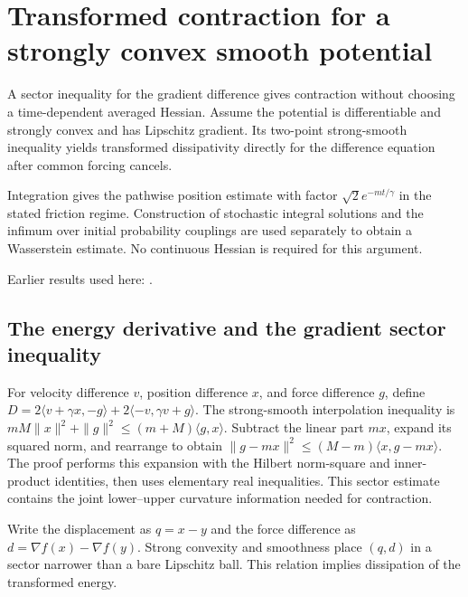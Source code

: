 \documentclass[11pt,a4paper]{report}
\begin{document}
\section{\texorpdfstring{Transformed contraction for a strongly convex smooth potential}{Transformed contraction for a strongly convex smooth potential}}
\label{proof-module-KineticLangevin-PotentialContraction-lean}


A sector inequality for the gradient difference gives contraction without choosing a time-dependent averaged Hessian. Assume the potential is differentiable and strongly convex and has Lipschitz gradient. Its two-point strong-smooth inequality yields transformed dissipativity directly for the difference equation after common forcing cancels.



Integration gives the pathwise position estimate with factor \(\sqrt2e^{-mt/\gamma}\) in the stated friction regime. Construction of stochastic integral solutions and the infimum over initial probability couplings are used separately to obtain a Wasserstein estimate. No continuous Hessian is required for this argument.



Earlier results used here: \cite[Section~3.10]{LangevinLean2026ULASC}.
\subsection{\texorpdfstring{The energy derivative and the gradient sector inequality}{The energy derivative and the gradient sector inequality}}
\label{report-step-KineticLangevin-PotentialContraction-lean-1}


For velocity difference \(v\), position difference \(x\), and force difference \(g\), define \(D=2\langle v+\gamma x,-g\rangle+2\langle-v,\gamma v+g\rangle\). The strong-smooth interpolation inequality is \(mM\|x\|^2+\|g\|^2\le(m+M)\langle g,x\rangle\). Subtract the linear part \(mx\), expand its squared norm, and rearrange to obtain \(\|g-mx\|^2\le(M-m)\langle x,g-mx\rangle\). The proof performs this expansion with the Hilbert norm-square and inner-product identities, then uses elementary real inequalities. This sector estimate contains the joint lower–upper curvature information needed for contraction.



Write the displacement as \(q=x-y\) and the force difference as \(d=\nabla f(x)-\nabla f(y)\). Strong convexity and smoothness place \((q,d)\) in a sector narrower than a bare Lipschitz ball. This relation implies dissipation of the transformed energy.
\end{document}

